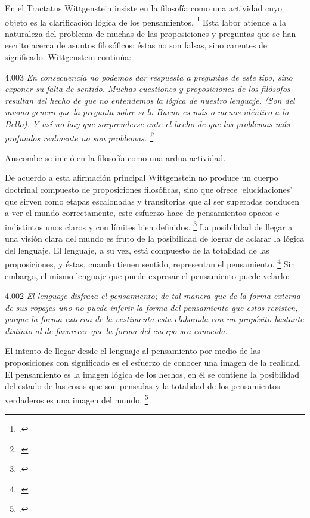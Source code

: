 \documentclass[../main.tex]{subfiles}
\begin{document}
En el Tractatus Wittgenstein insiste en la filosofía como una actividad cuyo objeto es la clarificación lógica de los pensamientos. \footcite[4.112 p. 52]{tractatus} Esta labor atiende a la naturaleza del problema de muchas de las proposiciones y preguntas que se han escrito acerca de asuntos filosóficos: éstas no son falsas, sino carentes de significado. Wittgenstein continúa:

4.003 \emph{En consecuencia no podemos dar respuesta a preguntas de este tipo, sino exponer su falta de sentido. Muchas cuestiones y proposiciones de los filósofos resultan del hecho de que no entendemos la lógica de nuestro lenguaje. (Son del mismo genero que la pregunta sobre si lo Bueno es más o menos idéntico a lo Bello). Y así no hay que sorprenderse ante el hecho de que los problemas más profundos realmente no son problemas. \footcite[4.003 p. 45]{tractatus}}

Anscombe se inició en la filosofía como una ardua actividad.

De acuerdo a esta afirmación principal Wittgenstein no produce un cuerpo doctrinal compuesto de proposiciones filosóficas, sino que ofrece `elucidaciones' que sirven como etapas escalonadas y transitorias que al ser superadas conducen a ver el mundo correctamente, este esfuerzo hace de pensamientos opacos e indistintos unos claros y con límites bien definidos. \footcite[cf. 4.112 y 6.54]{tractatus} La posibilidad de llegar a una visión clara del mundo es fruto de la posibilidad de lograr de aclarar la lógica del lenguaje. El lenguaje, a su vez, está compuesto de la totalidad de las proposiciones, y éstas, cuando tienen sentido, representan el pensamiento. \footcite[cf. 4 y 4.001]{tractatus} Sin embargo, el mismo lenguaje que puede expresar el pensamiento puede velarlo:

4.002 \emph{El lenguaje disfraza el pensamiento; de tal manera que de la forma externa de sus ropajes uno no puede inferir la forma del pensamiento que estos revisten, porque la forma externa de la vestimenta esta elaborada con un propósito bastante distinto al de favorecer que la forma del cuerpo sea conocida.}

El intento de llegar desde el lenguaje al pensamiento por medio de las proposiciones con significado es el esfuerzo de conocer una imagen de la realidad. El pensamiento es la imagen lógica de los hechos, en él se contiene la posibilidad del estado de las cosas que son pensadas y la totalidad de los pensamientos verdaderos es una imagen del mundo. \footcite[cf. 3 y 3.001]{tractatus}
\end{document}
